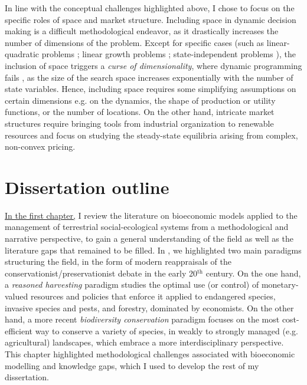 In line with the conceptual challenges highlighted above, I chose to focus on the specific roles of space and market structure. Including space in dynamic decision making is a difficult methodological endeavor, as it drastically increases the number of dimensions of the problem. Except for specific cases (such as linear-quadratic problems \citep{blackwood_cost-effective_2010}; linear growth problems \citep{fabbri_competition_2022}; state-independent problems \citep{costello_optimal_2008, costello_private_2017}), the inclusion of space triggers a \textit{curse of dimensionality}, where dynamic programming fails \citep{Bellman}, as the size of the search space increases exponentially with the number of state variables. Hence, including space requires some simplifying assumptions on certain dimensions e.g. on the dynamics, the shape of production or utility functions, or the number of locations. On the other hand, intricate market structures require bringing tools from industrial organization to renewable resources and focus on studying the steady-state equilibria arising from complex, non-convex pricing. 

\section*{Dissertation outline}

\hyperref[chapter1]{In the first chapter,} I review the literature on bioeconomic models applied to the management of terrestrial social-ecological systems from a methodological and narrative perspective, to gain a general understanding of the field as well as the literature gaps that remained to be filled. In \cite{jean_bioeconomic_2022},  we highlighted two main paradigms structuring the field, in the form of modern reappraisals of the conservationist/preservationist debate \citep{Banzhaf2019} in the early 20$^\mathrm{th}$ century. On the one hand, a \textit{reasoned harvesting} paradigm studies the optimal use (or control) of monetary-valued resources and policies that enforce it applied to endangered species, invasive species and pests, and forestry, dominated by economists. On the other hand, a more recent \textit{biodiversity conservation} paradigm focuses on the most cost-efficient way to conserve a variety of species, in weakly to strongly managed (e.g. agricultural) landscapes, which embrace a more interdisciplinary perspective. This chapter highlighted methodological challenges associated with bioeconomic modelling and knowledge gaps, which I used to develop the rest of my dissertation.
\\

